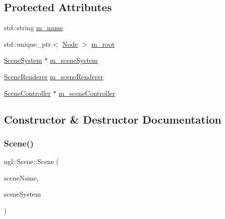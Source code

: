 \subsection*{Protected Attributes}
\begin{DoxyCompactItemize}
\item 
std\+::string \mbox{\hyperlink{classngl_1_1_scene_ab39b7218af6be2c7e720d3ec785c5287}{m\+\_\+name}}
\item 
std\+::unique\+\_\+ptr$<$ \mbox{\hyperlink{classngl_1_1_node}{Node}} $>$ \mbox{\hyperlink{classngl_1_1_scene_a3a9c2d91aeaffd0d040b17f959c129ed}{m\+\_\+root}}
\item 
\mbox{\hyperlink{classngl_1_1_scene_system}{Scene\+System}} $\ast$ \mbox{\hyperlink{classngl_1_1_scene_ab5fc913c32572b3847a0131d66c102b9}{m\+\_\+scene\+System}}
\item 
\mbox{\hyperlink{classngl_1_1_scene_renderer}{Scene\+Renderer}} \mbox{\hyperlink{classngl_1_1_scene_a5c5340f6ae9c671266009bf242f6329b}{m\+\_\+scene\+Renderer}}
\item 
\mbox{\hyperlink{classngl_1_1_scene_controller}{Scene\+Controller}} $\ast$ \mbox{\hyperlink{classngl_1_1_scene_a06579f1efcbbd8a9e21c4874f8e56972}{m\+\_\+scene\+Controller}}
\end{DoxyCompactItemize}


\subsection{Constructor \& Destructor Documentation}
\mbox{\label{classngl_1_1_scene_ab7c7e8880aab415a752af81e6b76e5d1}} 
\subsubsection{\texorpdfstring{Scene()}{Scene()}}
{\footnotesize\ttfamily ngl\+::\+Scene\+::\+Scene (\begin{DoxyParamCaption}\item[{const char $\ast$}]{scene\+Name,  }\item[{\mbox{\hyperlink{classngl_1_1_scene_system}{Scene\+System}} $\ast$}]{scene\+System }\end{DoxyParamCaption})\hspace{0.3cm}{\ttfamily [explicit]}}

\mbox{\label{classngl_1_1_scene_a8f721962cb9d8f2620713512006d2fd6}} 
